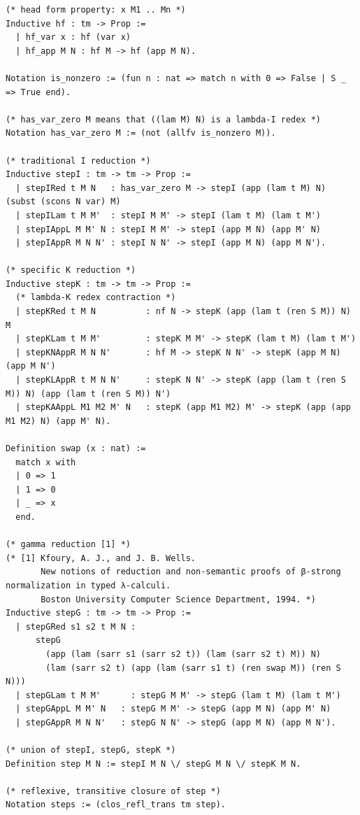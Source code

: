\begin{lstlisting}[style=authorcoq]
(* head form property: x M1 .. Mn *)
Inductive hf : tm -> Prop :=
  | hf_var x : hf (var x)
  | hf_app M N : hf M -> hf (app M N).

Notation is_nonzero := (fun n : nat => match n with 0 => False | S _ => True end).

(* has_var_zero M means that ((lam M) N) is a lambda-I redex *)
Notation has_var_zero M := (not (allfv is_nonzero M)).

(* traditional I reduction *)
Inductive stepI : tm -> tm -> Prop :=
  | stepIRed t M N   : has_var_zero M -> stepI (app (lam t M) N) (subst (scons N var) M)
  | stepILam t M M'  : stepI M M' -> stepI (lam t M) (lam t M')
  | stepIAppL M M' N : stepI M M' -> stepI (app M N) (app M' N)
  | stepIAppR M N N' : stepI N N' -> stepI (app M N) (app M N').

(* specific K reduction *)
Inductive stepK : tm -> tm -> Prop :=
  (* lambda-K redex contraction *)
  | stepKRed t M N          : nf N -> stepK (app (lam t (ren S M)) N) M
  | stepKLam t M M'         : stepK M M' -> stepK (lam t M) (lam t M')
  | stepKNAppR M N N'       : hf M -> stepK N N' -> stepK (app M N) (app M N')
  | stepKLAppR t M N N'     : stepK N N' -> stepK (app (lam t (ren S M)) N) (app (lam t (ren S M)) N')
  | stepKAAppL M1 M2 M' N   : stepK (app M1 M2) M' -> stepK (app (app M1 M2) N) (app M' N).

Definition swap (x : nat) :=
  match x with
  | 0 => 1
  | 1 => 0
  | _ => x
  end.

(* gamma reduction [1] *)
(* [1] Kfoury, A. J., and J. B. Wells.
       New notions of reduction and non-semantic proofs of β-strong normalization in typed λ-calculi.
       Boston University Computer Science Department, 1994. *)
Inductive stepG : tm -> tm -> Prop :=
  | stepGRed s1 s2 t M N : 
      stepG
        (app (lam (sarr s1 (sarr s2 t)) (lam (sarr s2 t) M)) N)
        (lam (sarr s2 t) (app (lam (sarr s1 t) (ren swap M)) (ren S N)))
  | stepGLam t M M'      : stepG M M' -> stepG (lam t M) (lam t M')
  | stepGAppL M M' N   : stepG M M' -> stepG (app M N) (app M' N)
  | stepGAppR M N N'   : stepG N N' -> stepG (app M N) (app M N').

(* union of stepI, stepG, stepK *)
Definition step M N := stepI M N \/ stepG M N \/ stepK M N.

(* reflexive, transitive closure of step *)
Notation steps := (clos_refl_trans tm step).
\end{lstlisting}
\clearpage
